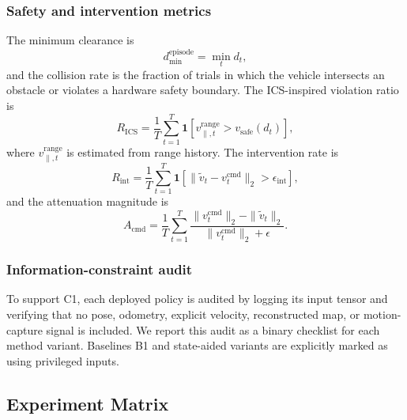 \documentclass[11pt]{article}
\begin{document}
\subsubsection{Safety and intervention metrics}
The minimum clearance is
\begin{equation}
    d_{\min}^{\mathrm{episode}} = \min_t d_t,
    \label{eq:metric_min_clearance}
\end{equation}
and the collision rate is the fraction of trials in which the vehicle intersects
an obstacle or violates a hardware safety boundary.  The ICS-inspired violation
ratio is
\begin{equation}
    R_{\mathrm{ICS}} =
    \frac{1}{T}\sum_{t=1}^{T}\mathbf{1}
    \left[v_{\parallel,t}^{\mathrm{range}}>v_{\mathrm{safe}}(d_t)\right],
    \label{eq:metric_ics_ratio}
\end{equation}
where $v_{\parallel,t}^{\mathrm{range}}$ is estimated from range history.  The
intervention rate is
\begin{equation}
    R_{\mathrm{int}} =
    \frac{1}{T}\sum_{t=1}^{T}\mathbf{1}
    \left[\|\tilde v_t-v^{\mathrm{cmd}}_t\|_2>\epsilon_{\mathrm{int}}\right],
    \label{eq:metric_intervention_rate}
\end{equation}
and the attenuation magnitude is
\begin{equation}
    A_{\mathrm{cmd}} =
    \frac{1}{T}\sum_{t=1}^{T}
    \frac{\|v^{\mathrm{cmd}}_t\|_2-\|\tilde v_t\|_2}
    {\|v^{\mathrm{cmd}}_t\|_2+\epsilon}.
    \label{eq:metric_attenuation}
\end{equation}

\subsubsection{Information-constraint audit}
To support C1, each deployed policy is audited by logging its input tensor and
verifying that no pose, odometry, explicit velocity, reconstructed map, or
motion-capture signal is included.  We report this audit as a binary checklist
for each method variant.  Baselines B1 and state-aided variants are explicitly
marked as using privileged inputs.

\subsection{Experiment Matrix}
\label{sec:exp_matrix}
\end{document}
